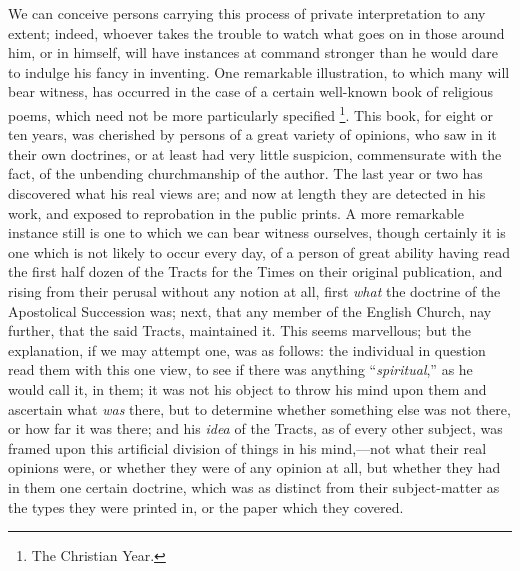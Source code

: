 We can conceive persons carrying this process of
private interpretation to any extent; indeed, whoever takes the
trouble to watch what goes on in those around him, or in himself, will
have instances at command stronger than he would dare to indulge his
fancy in inventing. One remarkable illustration, to which many will
bear witness, has occurred in the case of a certain well-known book of
religious poems, which need not be more particularly specified \footnote{The Christian Year.}. This book, for eight or ten years, was cherished by persons of
a great variety of opinions, who saw in it their own doctrines, or at
least had very little suspicion, commensurate with the fact, of
the unbending churchmanship of the author. The last year or two has
discovered what his real views are; and now at length they are
detected in his work, and exposed to reprobation in the public prints.
A more remarkable instance still is one to which we can bear witness
ourselves, though certainly it is one which is not likely to occur
every day, of a person of great ability having read the first half
dozen of the Tracts for the Times on their original publication, and
rising from their perusal without any notion at all, first \emph{what}
the doctrine of the Apostolical Succession was; next, that any member
of the English Church, nay further, that the said Tracts, maintained
it. This seems marvellous; but the explanation, if we may attempt one,
was as follows: the individual in question read them with this one
view, to see if there was anything ``\emph{spiritual},'' as he would
call it, in them; it was not his object to throw his mind upon them
and ascertain what \emph{was} there, but to determine whether
something else was not there, or how far it was there; and his \emph{idea}
of the Tracts, as of every other subject, was framed upon this
artificial division of things in his mind,—not what their real
opinions were, or whether they were of any opinion at all, but whether
they had in them one certain doctrine, which was as distinct from
their subject-matter as the types they were printed in, or the paper
which they covered.

